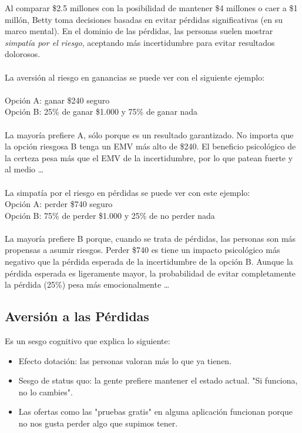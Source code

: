\documentclass{article}
\begin{document}
            Al comparar \$2.5 millones con la posibilidad de mantener \$4 millones o caer a \$1 millón, Betty toma decisiones basadas en evitar pérdidas significativas (en su marco mental). En el dominio de las pérdidas, las personas suelen mostrar \emph{simpatía por el riesgo}, aceptando más incertidumbre para evitar resultados dolorosos.
            \\
            \\
            La aversión al riesgo en ganancias se puede ver con el siguiente ejemplo: \\
            \\
            Opción A: ganar \$240 seguro \\
            Opción B: 25\% de ganar \$1.000 y 75\% de ganar nada \\
            \\
            La mayoría prefiere A, sólo porque es un resultado garantizado. No importa que la opción riesgosa B tenga un EMV más alto de \$240. El beneficio psicológico de la certeza pesa más que el EMV de la incertidumbre, por lo que patean fuerte y al medio \ldots \\
            \\
            La simpatía por el riesgo en pérdidas se puede ver con este ejemplo: \\
            Opción A: perder \$740 seguro \\
            Opción B: 75\% de perder \$1.000 y 25\% de no perder nada \\
            \\
            La mayoría prefiere B porque, cuando se trata de pérdidas, las personas son más propensas a asumir riesgos. Perder \$740 es tiene un impacto psicológico más negativo que la pérdida esperada de la incertidumbre de la opción B. Aunque la pérdida esperada es ligeramente mayor, la probabilidad de evitar completamente la pérdida (25\%) pesa más emocionalmente \ldots
        \subsection*{Aversión a las Pérdidas}
            Es un sesgo cognitivo que explica lo siguiente:
            \begin{itemize}
                \item Efecto dotación: las personas valoran más lo que ya tienen.
                \item Sesgo de status quo: la gente prefiere mantener el estado actual. "Si funciona, no lo cambies".
                \item Las ofertas como las "pruebas gratis" en alguna aplicación funcionan porque no nos gusta perder algo que supimos tener.
            \end{itemize}
\end{document}
